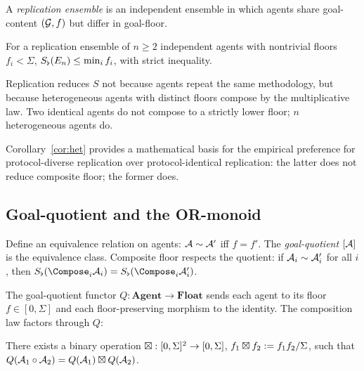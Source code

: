 \begin{definition}\label{def:rep-ens}
A \emph{replication ensemble} is an independent ensemble in which agents
share goal-content $(\mathcal{G},f)$ but differ in goal-floor.
\end{definition}

\begin{theorem}\label{thm:rep-red}
For a replication ensemble of $n\ge 2$ independent agents with nontrivial
floors $f_i<\Sigma$,
$S_{\flat}(E_n)\le\min_i f_i$, with strict inequality.
\end{theorem}

\begin{corollary}\label{cor:het}
Replication reduces $S$ not because agents repeat the same methodology, but
because heterogeneous agents with distinct floors compose by the
multiplicative law. Two identical agents do not compose to a strictly lower
floor; $n$ heterogeneous agents do.
\end{corollary}

Corollary~\ref{cor:het} provides a mathematical basis for the empirical
preference for protocol-diverse replication over protocol-identical
replication: the latter does not reduce composite floor; the former does.

\subsection{Goal-quotient and the OR-monoid}

\begin{construction}\label{con:goal-quot}
Define an equivalence relation on agents: $\mathcal{A}\sim\mathcal{A}'$ iff
$f=f'$. The \emph{goal-quotient} $[\mathcal{A}]$ is the equivalence class.
Composite floor respects the quotient: if $\mathcal{A}_i\sim\mathcal{A}_i'$ for all
$i$, then $\Sfloor(\Compose_i\agent_i)=\Sfloor(\Compose_i\agent_i')$.
\end{construction}

The goal-quotient functor $Q:\mathbf{Agent}\to\mathbf{Float}$ sends each
agent to its floor $f\in[0,\Sigma]$ and each floor-preserving morphism to
the identity. The composition law factors through $Q$:

\begin{theorem}\label{thm:cat-fact}
There exists a binary operation $\boxtimes:[0,\Sigma]^2\to[0,\Sigma]$,
$f_1\boxtimes f_2:=f_1f_2/\Sigma$, such that
$Q(\mathcal{A}_1\circ\mathcal{A}_2)=Q(\mathcal{A}_1)\boxtimes Q(\mathcal{A}_2)$.
\end{theorem}

